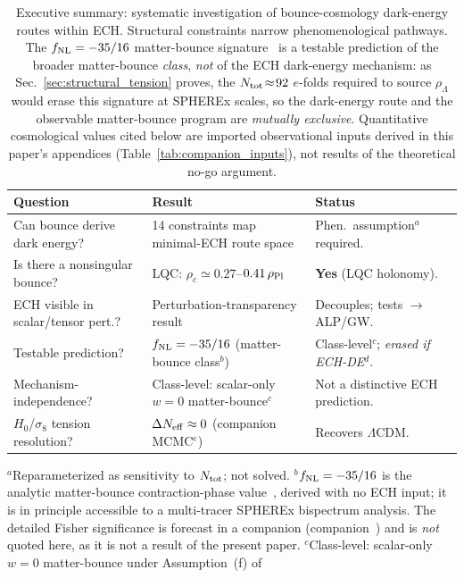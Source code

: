 \documentclass[aps,prd,twocolumn,superscriptaddress,showpacs,preprintnumbers,nofootinbib,longbibliography,floatfix]{revtex4-2}
\newcommand{\rhoPl}{\rho_{\rm Pl}}
\newcommand{\Neff}{N_{\rm eff}}
\newcommand{\fnl}{f_{\rm NL}}
\begin{document}
\begin{table}[tb]
\caption{\label{tab:summary} Executive summary: systematic investigation of
bounce-cosmology dark-energy routes within ECH. Structural constraints narrow
phenomenological pathways. The $\fnl = -35/16$ matter-bounce signature~\cite{Cai:2009fn}
is a testable prediction of the broader matter-bounce \emph{class}, \emph{not} of the
ECH dark-energy mechanism: as Sec.~\ref{sec:structural_tension} proves, the
$N_{\rm tot}\!\approx\!92$ $e$-folds required to source $\rho_\Lambda$ would erase
this signature at SPHEREx scales, so the dark-energy route and the observable
matter-bounce program are \emph{mutually exclusive}. Quantitative cosmological
values cited below are imported observational inputs derived in this paper's
appendices (Table~\ref{tab:companion_inputs}), not results of the theoretical
no-go argument.}
\begin{ruledtabular}
\begin{tabular}{lll}
\textbf{Question} & \textbf{Result} & \textbf{Status} \\
\hline
Can bounce derive dark energy? & 14 constraints map minimal-ECH route space & Phen.\ assumption$^a$ required. \\
Is there a nonsingular bounce? & LQC: $\rho_c \simeq 0.27$--$0.41\,\rhoPl$ & \textbf{Yes} (LQC holonomy). \\
ECH visible in scalar/tensor pert.? & Perturbation-transparency result & Decouples; tests $\to$ ALP/GW. \\
Testable prediction? & $\fnl = -35/16$ (matter-bounce class$^b$) & Class-level$^c$; \emph{erased if ECH-DE}$^d$. \\
Mechanism-independence? & Class-level: scalar-only $w=0$ matter-bounce$^c$ & Not a distinctive ECH prediction. \\
$H_0$/$\sigma_8$ tension resolution? & $\Delta\Neff\approx 0$ (companion MCMC$^e$) & Recovers $\Lambda$CDM. \\
\end{tabular}
\end{ruledtabular}
{\small $^a$Reparameterized as sensitivity to $N_{\rm tot}$; not solved.
$^b$$\fnl=-35/16$ is the analytic matter-bounce contraction-phase value~\cite{Cai:2009fn},
derived with no ECH input; it is in principle accessible to a multi-tracer SPHEREx
bispectrum analysis. The detailed Fisher significance is forecast in a companion
(companion~\cite{Golden2026P2}) and is \emph{not} quoted here, as it is not a
result of the present paper.
$^c$Class-level: scalar-only $w=0$ matter-bounce under Assumption~(f) of
$$}
\end{table}
\end{document}
